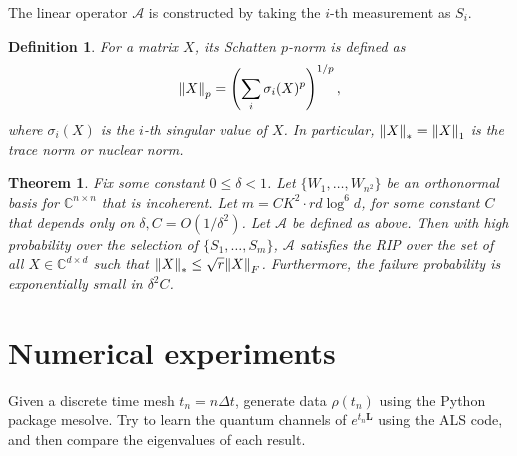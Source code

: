\documentclass[10pt]{article}  %
\theoremstyle{plain}
\newtheorem{theorem}{Theorem}[section]
\newtheorem{definition}[thm]{Definition}
\numberwithin{equation}{section}
\def\mA{\mathcal{A}}
\def\C{\mathbb{C}}
\newcommand{\bL}{\mathbf{L}}
\begin{document}
The linear operator $\mA$ is constructed by taking the $i$-th measurement as $S_i$. 
\begin{definition}
	For a matrix $X$, its Schatten $p$-norm is defined as 
	\begin{equation}
		\norm{X}_p = \left(\sum_{i}\sigma_i(X)^p\right)^{1/p},
	\end{equation}
	where $\sigma_i(X)$ is the $i$-th singular value of $X$. In particular, $\norm{X}_* = \norm{X}_1$ is the trace norm or nuclear norm. 
\end{definition}

\begin{theorem}\cite[Theorem 2.1]{liuUniversalLowrankMatrix2011}
	Fix some constant $0 \leq \delta <1$. Let $\{W_1, \dots, W_{n^2}\}$ be an orthonormal basis for $\C^{n \times n}$ that is incoherent. Let $m = CK^2\cdot rd \log^6 d$, for some constant $C$ that depends only on $\delta, C = O(1/\delta^2)$. Let $\mA$ be defined as above. Then with high probability over the selection of $\{S_1, \dots, S_m\}$, $\mA$ satisfies the RIP over the set of all $X\in \C^{d \times d}$ such that $\norm{X}_* \leq \sqrt{r} \norm{X}_F$. Furthermore, the failure probability is exponentially small in $\delta^2C$. 
\end{theorem}



\section{Numerical experiments}

Given a discrete time mesh $t_n = n \Delta t$, generate data $\rho(t_n)$ using the Python package mesolve. Try to learn the quantum channels of $e^{t_n\bL}$ using the ALS code, and then compare the eigenvalues of each result.



\printbibliography
\end{document}
